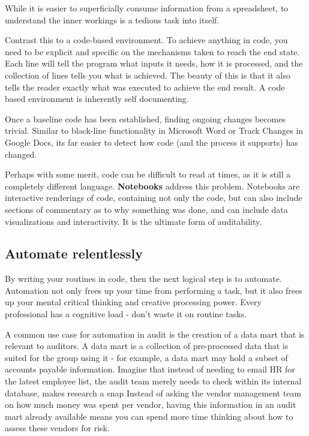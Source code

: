 \documentclass[
]{book}
\begin{document}
While it is easier to superficially consume information from a spreadsheet, to understand the inner workings is a tedious task into itself.

Contrast this to a code-based environment. To achieve anything in code, you need to be explicit and specific on the mechanisms taken to reach the end state. Each line will tell the program what inputs it needs, how it is processed, and the collection of lines tells you what is achieved. The beauty of this is that it also tells the reader exactly what was executed to achieve the end result. A code based environment is inherently self documenting.

Once a baseline code has been established, finding ongoing changes becomes trivial. Similar to black-line functionality in Microsoft Word or Track Changes in Google Docs, its far easier to detect how code (and the process it supports) has changed.

Perhaps with some merit, code can be difficult to read at times, as it is still a completely different language. \textbf{Notebooks} address this problem. Notebooks are interactive renderings of code, containing not only the code, but can also include sections of commentary as to why something was done, and can include data visualizations and interactivity. It is the ultimate form of auditability.

\hypertarget{automate-relentlessly}{%
\subsection{Automate relentlessly}\label{automate-relentlessly}}

By writing your routines in code, then the next logical step is to automate. Automation not only frees up your time from performing a task, but it also frees up your mental critical thinking and creative processing power. Every professional has a cognitive load - don't waste it on routine tasks.

A common use case for automation in audit is the creation of a data mart that is relevant to auditors. A data mart is a collection of pre-processed data that is suited for the group using it - for example, a data mart may hold a subset of accounts payable information. Imagine that instead of needing to email HR for the latest employee list, the audit team merely needs to check within its internal database, makes research a snap Instead of asking the vendor management team on how much money was spent per vendor, having this information in an audit mart already available means you can spend more time thinking about how to assess these vendors for risk.
\end{document}

